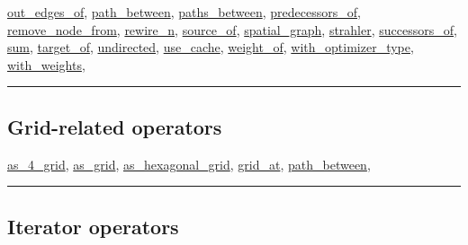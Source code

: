 \documentclass[]{book}
\theoremstyle{definition}
\theoremstyle{definition}
\theoremstyle{definition}
\theoremstyle{remark}
\begin{document}
\href{operators-n-to-r.html\#out_edges_of}{out\_edges\_of},
\href{operators-n-to-r.html\#path_between}{path\_between},
\href{operators-n-to-r.html\#paths_between}{paths\_between},
\href{operators-n-to-r.html\#predecessors_of}{predecessors\_of},
\href{operators-n-to-r.html\#remove_node_from}{remove\_node\_from},
\href{operators-n-to-r.html\#rewire_n}{rewire\_n},
\href{operators-s-to-z.html\#source_of}{source\_of},
\href{operators-s-to-z.html\#spatial_graph}{spatial\_graph},
\href{operators-s-to-z.html\#strahler}{strahler},
\href{operators-s-to-z.html\#successors_of}{successors\_of},
\href{operators-s-to-z.html\#sum}{sum},
\href{operators-s-to-z.html\#target_of}{target\_of},
\href{operators-s-to-z.html\#undirected}{undirected},
\href{operators-s-to-z.html\#use_cache}{use\_cache},
\href{operators-s-to-z.html\#weight_of}{weight\_of},
\href{operators-s-to-z.html\#with_optimizer_type}{with\_optimizer\_type},
\href{operators-s-to-z.html\#with_weights}{with\_weights},

\begin{center}\rule{0.5\linewidth}{\linethickness}\end{center}

\subsection{Grid-related operators}\label{grid-related-operators}

\href{operators-a-to-a.html\#as_4_grid}{as\_4\_grid},
\href{operators-a-to-a.html\#as_grid}{as\_grid},
\href{operators-a-to-a.html\#as_hexagonal_grid}{as\_hexagonal\_grid},
\href{operators-d-to-h.html\#grid_at}{grid\_at},
\href{operators-n-to-r.html\#path_between}{path\_between},

\begin{center}\rule{0.5\linewidth}{\linethickness}\end{center}

\subsection{Iterator operators}\label{iterator-operators}
\end{document}
